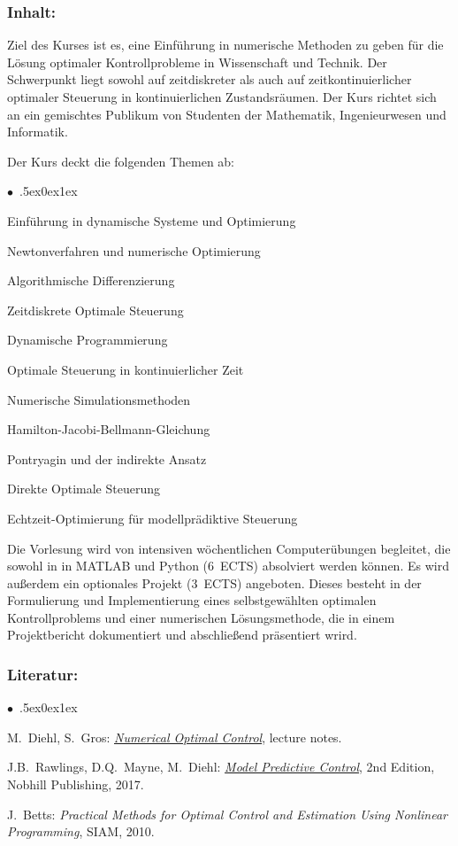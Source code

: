 \documentclass[a4paper,10pt]{article}
\renewenvironment{itemize}{\begin{list}{$\bullet$\ }{\itemsep.5ex\setlength{\topsep}{0.5\itemsep}\parsep0ex\labelsep1ex\settowidth{\labelwidth}{$\bullet$\ }\setlength{\leftmargin}{\labelwidth}\addtolength{\leftmargin}{3ex}\addtolength{\leftmargin}{\labelsep}}}{\end{list}}
\begin{document}
\subsubsection*{\large
    Inhalt:
}
Ziel des Kurses ist es, eine Einführung in numerische Methoden zu geben für die Lösung optimaler Kontrollprobleme in Wissenschaft und Technik. Der Schwerpunkt liegt sowohl auf zeitdiskreter als auch auf zeitkontinuierlicher optimaler Steuerung in kontinuierlichen Zustandsräumen. Der Kurs richtet sich an ein gemischtes Publikum von Studenten der Mathematik, Ingenieurwesen und Informatik.

Der Kurs deckt die folgenden Themen ab:
\begin{itemize}
\item Einführung in dynamische Systeme und Optimierung
\item Newtonverfahren und numerische Optimierung
\item Algorithmische Differenzierung
\item Zeitdiskrete Optimale Steuerung
\item Dynamische Programmierung
\item Optimale Steuerung in kontinuierlicher Zeit
\item Numerische Simulationsmethoden
\item Hamilton-Jacobi-Bellmann-Gleichung
\item Pontryagin und der indirekte Ansatz
\item Direkte Optimale Steuerung
\item Echtzeit-Optimierung für modellprädiktive Steuerung
\end{itemize}

Die Vorlesung wird von intensiven wöchentlichen Computerübungen begleitet, die sowohl in in MATLAB und Python (6~ECTS) absolviert werden können. Es wird außerdem ein optionales Projekt (3~ECTS) angeboten. Dieses besteht in der Formulierung und Implementierung eines selbstgewählten optimalen Kontrollproblems und einer numerischen Lösungsmethode, die in einem Projektbericht dokumentiert und abschließend präsentiert wrird.
\subsubsection*{\large
    Literatur:
}
\begin{itemize}
\item
 M.~Diehl, S.~Gros: \href{https://www.syscop.de/files/2020ss/NOC/book-NOCSE.pdf}{\emph{Numerical Optimal Control}}, lecture notes. 
\item
J.B.~Rawlings, D.Q.~Mayne, M.~Diehl: \href{https://sites.engineering.ucsb.edu/\~jbraw/mpc/MPC-book-2nd-edition-4th-printing.pdf}{\emph{Model Predictive Control}}, 2nd Edition, Nobhill Publishing, 2017.
\item
J.~Betts: \emph{Practical Methods for Optimal Control and Estimation Using Nonlinear Programming}, SIAM, 2010.
\end{itemize}
\end{document}
